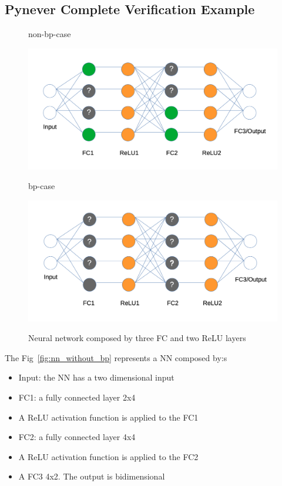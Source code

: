 \subsection{Pynever Complete Verification Example}

\begin{figure}[htbp]
  \centering
  \begin{minipage}[t]{0.4\textwidth}
    	\centering
   	\caption{\label{fig:nn_with_bp} non-bp-case}
	\includegraphics[scale=0.3]{"Chapter6/img/nn_with_bp"}
	\label{fig:nn_with_bp} 
  \end{minipage}
  
  \vspace{1cm}
  
  \begin{minipage}[t]{0.4\textwidth}
   	\centering
   	\caption{\label{fig:nn_without_bp} bp-case}
	\includegraphics[scale=0.3]{"Chapter6/img/nn_without_bp"}
	\label{fig:nn_without_bp}
  \end{minipage}

  \caption{Neural network composed by three FC and two ReLU layers}
  \label{fig:images}
\end{figure}


The Fig~\ref{fig:nn_without_bp} represents a NN composed by:s
\begin{itemize}
	\item Input: the NN has a two dimensional input
	\item FC1: a fully connected layer 2x4
	\item A ReLU activation function is applied to the FC1
	\item FC2: a fully connected layer 4x4 
	\item A ReLU activation function is applied to the FC2
	\item A FC3 4x2. The output is bidimensional
\end{itemize}

